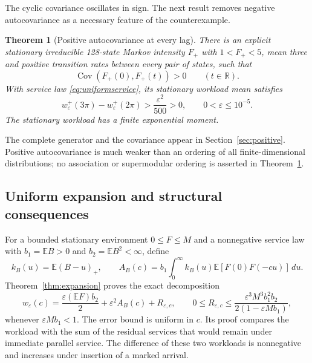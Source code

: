 \documentclass[10pt,a4paper]{amsart}
\numberwithin{equation}{section}
\newtheorem{theorem}{Theorem}[section]
\newcommand{\E}{\mathbb E}
\newcommand{\R}{\mathbb R}
\newcommand{\1}{\mathbf 1}
\newcommand{\eps}{\varepsilon}
\DeclareMathOperator{\Cov}{Cov}
\begin{document}
The cyclic covariance oscillates in sign. The next result removes negative autocovariance as a necessary feature of the counterexample.
\begin{theorem}[Positive autocovariance at every lag]\label{thm:positive}
There is an explicit stationary irreducible 128-state Markov intensity $F_+$ with $1<F_+<5$, mean three and positive transition rates between every pair of states, such that
\begin{equation}\label{eq:poscovintro}
 \Cov(F_+(0),F_+(t))>0\qquad(t\in\R).
\end{equation}
With service law \eqref{eq:uniformservice}, its stationary workload mean satisfies
\begin{equation}\label{eq:positivegap}
 w^+_\eps(3\pi)-w^+_\eps(2\pi)>\frac{\eps^2}{500}>0,
 \qquad 0<\eps\le10^{-5}.
\end{equation}
The stationary workload has a finite exponential moment.
\end{theorem}
The complete generator and the covariance appear in Section~\ref{sec:positive}. Positive autocovariance is much weaker than an ordering of all finite-dimensional distributions; no association or supermodular ordering is asserted in Theorem~\ref{thm:positive}.

\subsection{Uniform expansion and structural consequences}
For a bounded stationary environment $0\le F\le M$ and a nonnegative service law with $b_1=\E B>0$ and $b_2=\E B^2<\infty$, define
\begin{equation}\label{eq:kernelintro}
 k_B(u)=\E(B-u)_+,
 \qquad
 A_B(c)=b_1\int_0^\infty k_B(u)\E[F(0)F(-cu)]\,du.
\end{equation}
Theorem~\ref{thm:expansion} proves the exact decomposition
\begin{equation}\label{eq:introexp}
 w_\eps(c)=\frac{\eps(\E F)b_2}{2}+\eps^2A_B(c)+R_{\eps,c},
 \qquad
 0\le R_{\eps,c}\le
 \frac{\eps^3M^3b_1^2b_2}{2(1-\eps Mb_1)},
\end{equation}
whenever $\eps Mb_1<1$. The error bound is uniform in $c$. Its proof compares the workload with the sum of the residual services that would remain under immediate parallel service. The difference of these two workloads is nonnegative and increases under insertion of a marked arrival.
\end{document}
